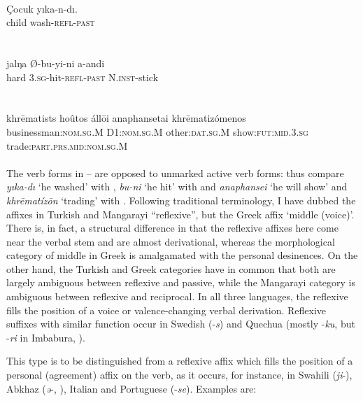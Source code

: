 \ea\label{ex:E16}
\\
\gll Çocuk  yıka-n-dı.\\
 child  wash-\textsc{refl}-\textsc{past}\\
\\
\z
\noindent \ea\label{ex:E17}
 \\
\gll jalŋa  Ø-bu-yi-ni  a-andi\\
hard  3.\textsc{sg}-hit-\textsc{refl}-\textsc{past}  N.\textsc{inst}-stick\\
\\
\z
\noindent \ea\label{ex:E18}
\\
\gll   khr\=ematists  hoûtos áll\=oi  anaphansetai  khr\=ematizómenos\\
 businessman:\textsc{nom}.\textsc{sg}.M  D1:\textsc{nom}.\textsc{sg}.M  other:\textsc{dat}.\textsc{sg}.M show:\textsc{fut}:\textsc{mid}.3.\textsc{sg} trade:\textsc{part}.\textsc{prs}.\textsc{mid}:\textsc{nom}.\textsc{sg}.M\\
\\
\z
\noindent The verb forms in -- are opposed to unmarked active verb forms: thus compare \textit{yıka-dı} ‘he washed’ with , \textit{bu-ni} ‘he hit’ with  and \textit{anaphansei} ‘he will show’ and \textit{khr\=ematíz\=on} ‘trading’ with . Following traditional terminology, I have dubbed the affixes in Turkish and Mangarayi ``reflexive'', but the Greek affix ‘middle (voice)’. There is, in fact, a structural difference in that the reflexive affixes here come near the verbal stem and are almost derivational, whereas the morphological category of middle in Greek is amalgamated with the personal desinences. On the other hand, the Turkish and Greek categories have in common that both are largely ambiguous between reflexive and passive, while the Mangarayi category is ambiguous between reflexive and reciprocal. In all three languages, the reflexive fills the position of a voice or valence-changing verbal derivation. Reflexive suffixes with similar function occur in Swedish (-\textit{s}) and Quechua (mostly -\textit{ku}, but -\textit{ri} in Imbabura, \citealt[90f]{Cole1982}).

This type is to be distinguished from a reflexive affix which fills the position of a personal (agreement) affix on the verb, as it occurs, for instance, in Swahili (\textit{ji}{}-), Abkhaz (\textit{ə}{}-, \citealt[77]{Hewitt1979}), Italian and Portuguese (-\textit{se}). Examples are:

